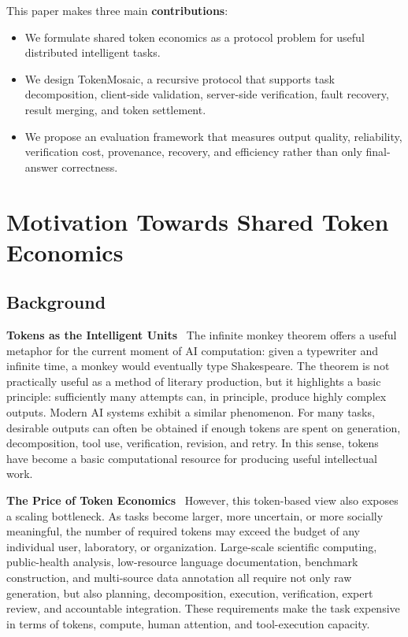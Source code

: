 \documentclass{article}
\theoremstyle{plain}
\begin{document}
This paper makes three main \textbf{contributions}:

\begin{itemize}
\item We formulate shared token economics as a protocol problem for useful distributed intelligent tasks.
 \item We design TokenMosaic, a recursive protocol that supports task decomposition, client-side validation, server-side verification, fault recovery, result merging, and token settlement.
\item  We propose an evaluation framework that measures output quality, reliability, verification cost, provenance, recovery, and efficiency rather than only final-answer correctness.
\end{itemize}






\section{Motivation Towards Shared Token Economics}


\subsection{Background}

\textbf{Tokens as the Intelligent Units}~
The infinite monkey theorem offers a useful metaphor for the current moment of AI computation: given a typewriter and infinite time, a monkey would eventually type Shakespeare. The theorem is not practically useful as a method of literary production, but it highlights a basic principle: sufficiently many attempts can, in principle, produce highly complex outputs. Modern AI systems exhibit a similar phenomenon. For many tasks, desirable outputs can often be obtained if enough tokens are spent on generation, decomposition, tool use, verification, revision, and retry. In this sense, tokens have become a basic computational resource for producing useful intellectual work.

\textbf{The Price of Token Economics}~
However, this token-based view also exposes a scaling bottleneck. As tasks become larger, more uncertain, or more socially meaningful, the number of required tokens may exceed the budget of any individual user, laboratory, or organization. Large-scale scientific computing, public-health analysis, low-resource language documentation, benchmark construction, and multi-source data annotation all require not only raw generation, but also planning, decomposition, execution, verification, expert review, and accountable integration. These requirements make the task expensive in terms of tokens, compute, human attention, and tool-execution capacity.
\end{document}

